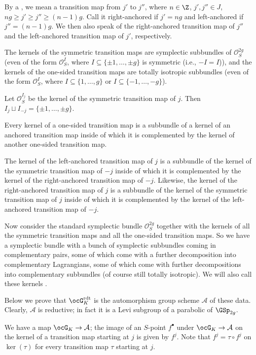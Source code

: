 \documentclass[a4paper]{scrartcl} %
\numberwithin{equation}{section}
\begin{document}
By a , we mean a transition map from $j'$ to $j''$, where $n\in\Z$, $j',j''\in J$, $ng\geq j'\geq j''\geq (n-1)g$. Call it right-anchored if $j'=ng$ and left-anchored if $j''=(n-1)g$. We then also speak of the right-anchored transition map of $j''$ and the left-anchored transition map of $j'$, respectively. 

The kernels of the symmetric transition maps are symplectic subbundles of $\mathcal{O}_S^{2g}$ (even of the form $\mathcal{O}_S^I$, where $I\subseteq\{\pm 1,\dotsc,\pm g\}$ is symmetric (i.e., $-I=I$)), and the kernels of the one-sided transition maps are totally isotropic subbundles (even of the form $\mathcal{O}_S^I$, where $I\subseteq \{1,\dotsc,g\}$ or $I\subseteq\{-1,\dotsc,-g\}$).

Let $\mathcal{O}_S^{I_j}$ be the kernel of the symmetric transition map of $j$. Then $I_j \sqcup I_{-j}=\{\pm 1,\dotsc,\pm g\}$.

Every kernel of a one-sided transition map is a subbundle of a kernel of an anchored transition map inside of which it is complemented by the kernel of another one-sided transition map.

The kernel of the left-anchored transition map of $j$ is a subbundle of the kernel of the symmetric transition map of $-j$ inside of which it is complemented by the kernel of the right-anchored transition map of $-j$. Likewise, the kernel of the right-anchored transition map of $j$ is a subbundle of the kernel of the symmetric transition map of $j$ inside of which it is complemented by the kernel of the left-anchored transition map of $-j$.

Now consider the standard symplectic bundle $\mathcal{O}_S^{2g}$ together with the kernels of all the symmetric transition maps and all the one-sided transition maps. So we have a symplectic bundle with a bunch of symplectic subbundles coming in complementary pairs, some of which come with a further decomposition into complementary Lagrangians, some of which come with further decompositions into complementary subbundles (of course still totally isotropic). We will also call these kernels . 

Below we prove that $\ocG_K^\mathrm{rdt}$ is the automorphism group scheme $\mathcal{A}$ of these data. Clearly, $\mathcal{A}$ is reductive; in fact it is a Levi subgroup of a parabolic of $\GSp_{2g}$.

We have a map $\ocG_K\to\mathcal{A}$; the image of an $S$-point $f^\bullet$ under $\ocG_K\to\mathcal{A}$ on the kernel of a transition map starting at $j$ is given by $f^j$. Note that $f^j=\tau\circ f^j$ on $\ker(\tau)$ for every transition map $\tau$ starting at $j$.
\end{document}
